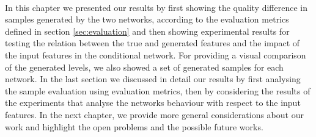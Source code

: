 \paragraph{} In this chapter we presented our results by first showing the quality difference in samples generated by the two networks, according to the evaluation metrics defined in section \ref{sec:evaluation} and then showing experimental results for testing the relation between the true and generated features and the impact of the input features in the conditional network. For providing a visual comparison of the generated levels, we also showed a set of generated samples for each network. In the last section we discussed in detail our results by first analysing the sample evaluation using evaluation metrics, then by considering the results of the experiments that analyse the networks behaviour with respect to the input features. In the next chapter, we provide more general considerations about our work and highlight the open problems and the possible future works.